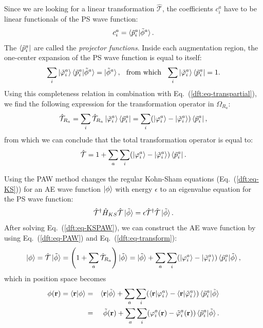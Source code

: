 \begin{refsection}
Since we are looking for a linear transformation $\hat{\mathcal{T}}$, the 
coefficients $c_i^a$ have to be linear functionals of the PS wave function: 
\begin{equation} 
c_i^a = \braket{\tilde{p}_i^a | \tilde{\phi}^a}. 
\end{equation} 
The $\bra{\tilde{p}_i^a}$ are called the \textit{projector functions}. Inside 
each augmentation region, the one-center expansion of the PS wave function is 
equal to itself: 
\begin{equation} 
\sum_i \ket{\tilde{\varphi}_i^a}\braket{\tilde{p}_i^a | \tilde{\phi}^a} = 
\ket{\tilde{\phi}^a},\hspace{0.1in}\text{from which} \hspace{0.1in} \sum_i 
\ket{\tilde{\varphi}_i^a}\bra{\tilde{p}_i^a} = 1.  
\end{equation} 
Using this completeness relation in combination with 
Eq.~(\ref{dft:eq-transpartial}), we find the following expression for the 
transformation operator in $\Omega_{R_a}$: 
\begin{equation} 
\hat{\mathcal{T}}_{R_a} = \sum_i \hat{\mathcal{T}}_{R_a} 
\ket{\tilde{\varphi}_i^a}\bra{\tilde{p}_i^a} = \sum_i(\ket{\varphi_i^a} - 
\ket{\tilde{\varphi}_i^a})\bra{\tilde{p}_i^a}, 
\end{equation} 
from which we can conclude that the total transformation operator is equal to: 
\begin{equation}\label{dft:eq-transform} 
\hat{\mathcal{T}} = 1 + \sum_a \sum_i(\ket{\varphi_i^a} - 
\ket{\tilde{\varphi}_i^a})\bra{\tilde{p}_i^a}. 
\end{equation} 
 
Using the PAW method changes the regular Kohn-Sham equations 
(Eq.~(\ref{dft:eq-KS})) for an AE wave function $\ket{\phi}$ with energy 
$\epsilon$ to an eigenvalue equation for the PS wave function: 
\begin{equation}\label{dft:eq-KSPAW} 
\hat{\mathcal{T}}^\dagger \hat{H}_{KS} \hat{\mathcal{T}} \ket{\tilde{\phi}} = 
\epsilon \hat{\mathcal{T}}^\dagger \hat{\mathcal{T}} \ket{\tilde{\phi}}. 
\end{equation} 
After solving Eq.~(\ref{dft:eq-KSPAW}), we can construct the AE wave function by 
using Eq.~(\ref{dft:eq-PAW}) and Eq.~(\ref{dft:eq-transform}): 
\begin{equation} 
\ket{\phi} = \hat{\mathcal{T}} \ket{\tilde{\phi}} = \left(1 + \sum_a 
\hat{\mathcal{T}}_{R_a}\right) \ket{\tilde{\phi}}= \ket{\tilde{\phi}} + \sum_a 
\sum_i(\ket{\varphi_i^a} - \ket{\tilde{\varphi}_i^a})\braket{\tilde{p}_i^a | 
\tilde{\phi}}, 
\end{equation} 
which in position space becomes 
\begin{eqnarray} 
\phi(\mathbf{r}) = \braket{\mathbf{r} | \phi} &=& \braket{\mathbf{r} 
|\tilde{\phi}} + \sum_a \sum_i(\braket{\mathbf{r} | \varphi_i^a} - 
\braket{\mathbf{r} | \tilde{\varphi}_i^a})\braket{\tilde{p}_i^a | 
\tilde{\phi}} 
\\&=& \tilde{\phi}(\mathbf{r}) + \sum_a \sum_i(\varphi_i^a(\mathbf{r}) - 
\tilde{\varphi}_i^a (\mathbf{r}))\braket{\tilde{p}_i^a | \tilde{\phi}}. 
\end{eqnarray} 
 

\end{refsection}
